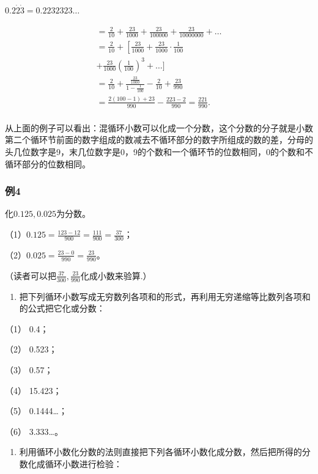  \(0.2\dot{2}\dot{3} = 0.2232323\dots\)

\[
\begin{array}{l} = \frac{2}{10} + \frac{23}{1000} + \frac{23}{100000} + \frac{23}{10000000} + \dots \\ = \frac{2}{10} + \left[ \frac{23}{1000} + \frac{23}{1000} \cdot \frac{1}{100} \right. \\ + \frac{23}{1000} \left(\frac{1}{100}\right)^{3} + \dots ] \\ = \frac{2}{10} + \frac{\frac{23}{1000}}{1 - \frac{1}{100}} - \frac{2}{10} + \frac{23}{990} \\ = \frac{2 (100 - 1) + 23}{990} - \frac{223 - 2}{990} = \frac{221}{990}. \\ \end{array}
\]

从上面的例子可以看出：混循环小数可以化成一个分数，这个分数的分子就是小数第二个循环节前面的数字组成的数减去不循环部分的数字所组成的数的差，分母的头几位数字是9，末几位数字是0，9的个数和一个循环节的位数相同，0的个数和不循环部分的位数相同。

\subsubsection{例4}

化\(0.125, 0.025\)为分数。

（1）\(0.125 = \frac{123 - 12}{900} = \frac{111}{900} = \frac{37}{300}\)；

（2）\(0.025 = \frac{23 - 0}{990} = \frac{23}{990}\)。

（读者可以把\(\frac{37}{300}, \frac{23}{990}\)化成小数来验算.）

\begin{enumerate}
\item
  把下列循环小数写成无穷数列各项和的形式，再利用无穷递缩等比数列各项和的公式把它化或分数：
\end{enumerate}

（1） 0.4；

（2） 0.523；

（3） 0.57；

（4） 15.423；

（5） 0.1444\ldots；

（6） 3.333\ldots。

\begin{enumerate}[start=2]
\item
  利用循环小数化分数的法则直接把下列各循环小数化成分数，然后把所得的分数化成循环小数进行检验：
\end{enumerate}


